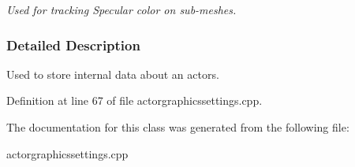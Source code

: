 \begin{DoxyCompactItemize}
\begin{DoxyCompactList}\small\item\em Used for tracking Specular color on sub-\/meshes. \item\end{DoxyCompactList}\end{DoxyCompactItemize}


\subsubsection{Detailed Description}
Used to store internal data about an actors. 

Definition at line 67 of file actorgraphicssettings.cpp.



The documentation for this class was generated from the following file:\begin{DoxyCompactItemize}
\item 
actorgraphicssettings.cpp\end{DoxyCompactItemize}
